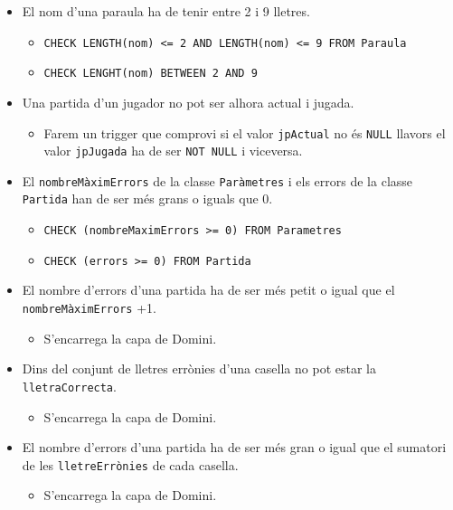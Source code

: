 \begin{itemize}
	\item El nom d’una paraula ha de tenir entre 2 i 9 lletres.
		\begin{itemize}
			\item \texttt{CHECK LENGTH(nom) <= 2 AND LENGTH(nom) <= 9 FROM Paraula}
			\item \texttt{CHECK LENGHT(nom) BETWEEN 2 AND 9}
		\end{itemize}
	\item Una partida d’un jugador no pot ser alhora actual i jugada.
		\begin{itemize}
			\item Farem un trigger que comprovi si el valor \texttt{jpActual} no és \texttt{NULL} llavors el valor \texttt{jpJugada} ha de ser \texttt{NOT NULL} i viceversa.
		\end{itemize}
	\item El \texttt{nombreMàximErrors} de la classe \texttt{Paràmetres} i els errors de la classe \texttt{Partida} han de ser més grans o iguals que 0.
		\begin{itemize}
			\item \texttt{CHECK (nombreMaximErrors >= 0) FROM Parametres}
			\item \texttt{CHECK (errors >= 0) FROM Partida}
		\end{itemize}
	\item El nombre d’errors d’una partida ha de ser més petit o igual que el \texttt{nombreMàximErrors} +1.
		\begin{itemize}
			\item S’encarrega la capa de Domini.
		\end{itemize}
	\item Dins del conjunt de lletres errònies d’una casella no pot estar la \texttt{lletraCorrecta}.
		\begin{itemize}
			\item S’encarrega la capa de Domini.
		\end{itemize}
	\item El nombre d’errors d’una partida ha de ser més gran o igual que el sumatori de les \texttt{lletreErrònies} de cada casella.
		\begin{itemize}
			\item S’encarrega la capa de Domini.
		\end{itemize}
\end{itemize}

